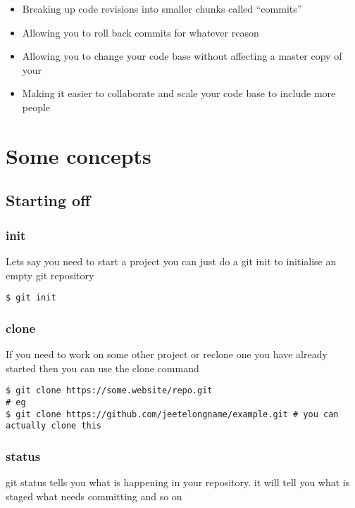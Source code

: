\documentclass[a4paper]{article}
\begin{document}
\begin{itemize}
\item Breaking up code revisions into smaller chunks called ``commits''
\item Allowing you to roll back commits for whatever reason
\item Allowing you to change your code base without affecting a master copy of your
\item Making it easier to collaborate and scale your code base to include more people
\end{itemize}

\section*{Some concepts}
\label{sec:orgfba4793}
\subsection*{Starting off}
\label{sec:org5c8ea41}
\subsubsection*{init}
\label{sec:org34a9433}
\begin{notes}
Lets say you need to start a project you can just do a git init to initialise an
empty git repository
\end{notes}
\begin{verbatim}
$ git init
\end{verbatim}
\subsubsection*{clone}
\label{sec:orge51be95}
\begin{notes}
If you need to work on some other project or reclone one you have already
started then you can use the clone command
\end{notes}

\begin{verbatim}
$ git clone https://some.website/repo.git
# eg
$ git clone https://github.com/jeetelongname/example.git # you can actually clone this
\end{verbatim}
\subsubsection*{status}
\label{sec:orge4f2862}
\begin{notes}
git status tells you what is happening in your repository. it will tell you what
is staged what needs committing and so on
\end{notes}
\end{document}
